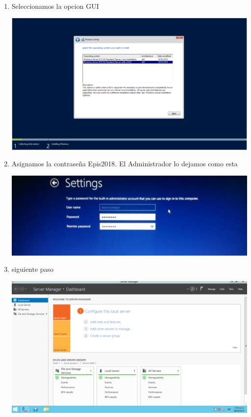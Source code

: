 \begin{enumerate}[1.]
	\item Seleccionamos la opcion GUI

	\begin{center}
	\includegraphics[width=15cm]{./Imagenes/img7server} 
	\end{center}


	\item Asignamos la contraseña Epis2018. El Administrador lo dejamos como esta

	\begin{center}
	\includegraphics[width=15cm]{./Imagenes/img8server} 
	\end{center}
	
	\item siguiente paso

	\begin{center}
	\includegraphics[width=15cm]{./Imagenes/img9server} 
	\end{center}



\end{enumerate}
